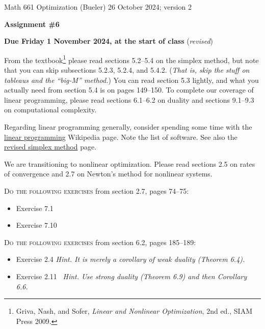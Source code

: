 \documentclass[12pt]{amsart}
\begin{document}
\scriptsize \noindent Math 661 Optimization (Bueler) \hfill 26 October 2024; version 2
\normalsize

\medskip\bigskip

\Large\centerline{\textbf{Assignment \#6}}
\large
\bigskip

\centerline{{\color{BrickRed} \textbf{Due Friday 1 November 2024, at the start of class} (\emph{revised})}}
\bigskip
\normalsize

\thispagestyle{empty}

\bigskip
\noindent From the textbook\footnote{Griva, Nash, and Sofer, \emph{Linear and Nonlinear Optimization}, 2nd ed., SIAM Press 2009.} please read sections 5.2--5.4 on the simplex method, but note that you can skip subsections 5.2.3, 5.2.4, and 5.4.2.  (\emph{That is, skip the stuff on tableaus and the ``big-M'' method.})  You can read section 5.3 lightly, and what you actually need from section 5.4 is on pages 149--150.  To complete our coverage of linear programming, please read sections 6.1--6.2 on duality and sections 9.1--9.3 on computational complexity.

\medskip \noindent Regarding linear programming generally, consider spending some time with the \href{https://en.wikipedia.org/wiki/Linear_programming}{linear programming} Wikipedia page.  Note the list of software.  See also the \href{https://en.wikipedia.org/wiki/Revised_simplex_method}{revised simplex method} page.

\medskip \noindent We are transitioning to nonlinear optimization.  Please read sections 2.5 on rates of convergence and 2.7 on Newton's method for nonlinear systems.

\bigskip
\noindent \textsc{Do the following exercises} from section 2.7, pages 74--75:

\begin{itemize}
\item Exercise 7.1
\item Exercise 7.10
\end{itemize}

\bigskip
\noindent \textsc{Do the following exercises} from section 6.2, pages 185--189:

\begin{itemize}
\item Exercise 2.4 \quad \emph{Hint.  It is merely a corollary of weak duality (Theorem 6.4).}
\item Exercise 2.11 \, \emph{Hint.  Use strong duality (Theorem 6.9) and then Corollary 6.6.}
\end{itemize}
\end{document}
